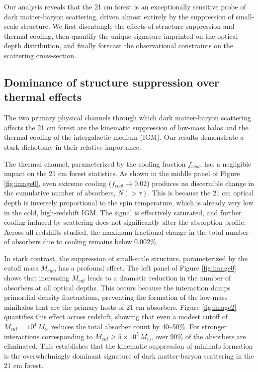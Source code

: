 \documentclass[]{article}
\begin{document}
Our analysis reveals that the 21 cm forest is an exceptionally sensitive probe of dark matter-baryon scattering, driven almost entirely by the suppression of small-scale structure. We first disentangle the effects of structure suppression and thermal cooling, then quantify the unique signature imprinted on the optical depth distribution, and finally forecast the observational constraints on the scattering cross-section.

\subsection{Dominance of structure suppression over thermal effects}

The two primary physical channels through which dark matter-baryon scattering affects the 21 cm forest are the kinematic suppression of low-mass halos and the thermal cooling of the intergalactic medium (IGM). Our results demonstrate a stark dichotomy in their relative importance.

The thermal channel, parameterized by the cooling fraction $f_{cool}$, has a negligible impact on the 21 cm forest statistics. As shown in the middle panel of Figure \ref{fig:image0}, even extreme cooling ($f_{cool} \to 0.02$) produces no discernible change in the cumulative number of absorbers, $N(>\tau)$. This is because the 21 cm optical depth is inversely proportional to the spin temperature, which is already very low in the cold, high-redshift IGM. The signal is effectively saturated, and further cooling induced by scattering does not significantly alter the absorption profile. Across all redshifts studied, the maximum fractional change in the total number of absorbers due to cooling remains below $0.002\%$.

In stark contrast, the suppression of small-scale structure, parameterized by the cutoff mass $M_{cut}$, has a profound effect. The left panel of Figure \ref{fig:image0} shows that increasing $M_{cut}$ leads to a dramatic reduction in the number of absorbers at all optical depths. This occurs because the interaction damps primordial density fluctuations, preventing the formation of the low-mass minihalos that are the primary hosts of 21 cm absorbers. Figure \ref{fig:image2} quantifies this effect across redshift, showing that even a modest cutoff of $M_{cut} = 10^4 \, M_\odot$ reduces the total absorber count by 40--50\%. For stronger interactions corresponding to $M_{cut} \ge 5 \times 10^5 \, M_\odot$, over 90\% of the absorbers are eliminated. This establishes that the kinematic suppression of minihalo formation is the overwhelmingly dominant signature of dark matter-baryon scattering in the 21 cm forest.
\end{document}
